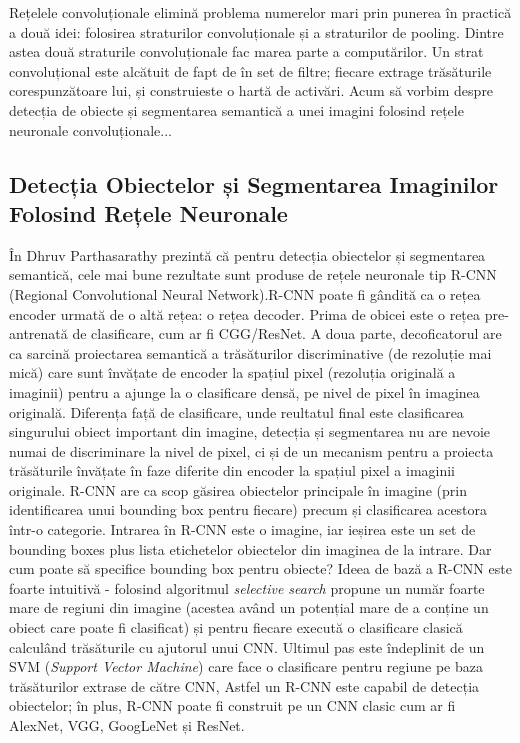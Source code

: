 Rețelele convoluționale elimină problema numerelor mari prin punerea în practică a două idei: folosirea straturilor convoluționale și a straturilor de pooling. Dintre astea două straturile convoluționale fac marea parte a computărilor. Un strat convoluțional este alcătuit de fapt de în set de filtre; fiecare extrage trăsăturile corespunzătoare lui, și construieste o hartă de activări.\newline
Acum să vorbim despre detecția de obiecte și segmentarea semantică a unei imagini folosind rețele neuronale convoluționale...
\subsection{Detecția Obiectelor și Segmentarea Imaginilor Folosind Rețele Neuronale}
În \cite{historyCNN} Dhruv Parthasarathy prezintă că pentru detecția obiectelor și segmentarea semantică, cele mai bune rezultate sunt produse de rețele neuronale tip R-CNN (Regional Convolutional Neural Network).R-CNN poate fi gândită ca o rețea encoder urmată de o altă rețea: o rețea decoder. Prima de obicei este o rețea pre-antrenată de clasificare, cum ar fi CGG/ResNet. A doua parte, decoficatorul are ca sarcină proiectarea semantică a trăsăturilor discriminative (de rezoluție mai mică) care sunt învățate de encoder la spațiul pixel (rezoluția originală a imaginii) pentru a ajunge la o clasificare densă, pe nivel de pixel în imaginea originală.\newline
Diferența față de clasificare, unde reultatul final este clasificarea singurului obiect important din imagine, detecția și segmentarea nu are nevoie numai de discriminare la nivel de pixel, ci și de un mecanism pentru a proiecta trăsăturile învățate în faze diferite din encoder la spațiul pixel a imaginii originale.\newline
R-CNN are ca scop găsirea obiectelor principale în imagine (prin identificarea unui bounding box pentru fiecare) precum și clasificarea acestora într-o categorie. Intrarea în R-CNN este o imagine, iar ieșirea este un set de bounding boxes plus lista etichetelor obiectelor din imaginea de la intrare. Dar cum poate să specifice bounding box pentru obiecte? Ideea de bază a R-CNN este foarte intuitivă - folosind algoritmul \textit{selective search} propune un număr foarte mare de regiuni din imagine (acestea având un potențial mare de a conține un obiect care poate fi clasificat) și pentru fiecare execută o clasificare clasică calculând trăsăturile cu ajutorul unui CNN. Ultimul pas este îndeplinit de un SVM (\textit{Support Vector Machine}) care face o clasificare pentru regiune pe baza trăsăturilor extrase de către CNN,\newline
Astfel un R-CNN este capabil de detecția obiectelor; în plus, R-CNN poate fi construit pe un CNN clasic cum ar fi AlexNet, VGG, GoogLeNet și ResNet.\newline


